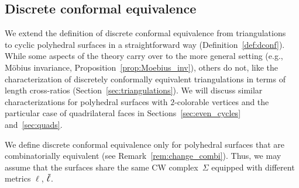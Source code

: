 \documentclass[Thesis]{subfiles}
\begin{document}
\subsection{Discrete conformal equivalence}
\label{sec:discr-conf-equiv}

We extend the definition of discrete conformal equivalence from
triangulations~\cite{Luo2004:Yamabe,BPS2015:dconf} to cyclic
polyhedral surfaces in a straightforward way
(Definition~\ref{def:dconf}). While some aspects of the theory carry
over to the more general setting (e.g., M{\"o}bius invariance,
Proposition~\ref{prop:Moebius_inv}), others do not, like the
characterization of discretely conformally equivalent triangulations
in terms of length cross-ratios (Section~\ref{sec:triangulations}). We
will discuss similar characterizations for polyhedral surfaces with
$2$-colorable vertices and the particular case of quadrilateral faces
in Sections~\ref{sec:even_cycles} and~\ref{sec:quads}.

We define discrete conformal equivalence only for polyhedral surfaces
that are combinatorially equivalent (see
Remark~\ref{rem:change_combi}). Thus, we may assume that the surfaces
share the same CW complex~$\Sigma$ equipped with different metrics
$\ell$, $\tilde{\ell}$.
\end{document}
